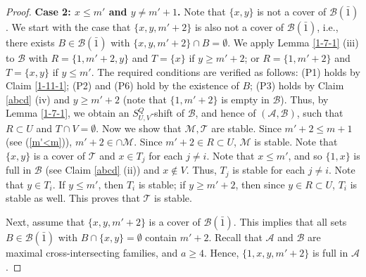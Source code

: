 \documentclass[11pt]{article}
\newcommand{\m}{\mathcal}
\begin{document}
\begin{proof}
{\bf Case 2: $x\le m'$ and $y\ne m'+1$.}
Note that $\{x,y\}$ is not a cover of $\m B(\bar1)$. 
We start with the case that $\{x,y,m'+2\}$ is also not a cover of $\m B(\bar1)$, i.e., there exists $B\in \m B(\bar{1})$ with $\{x,y,m'+2\}\cap B=\emptyset$. 
We apply Lemma \ref{1-7-1} (iii) to $\m B$ with $R=\{1, m'+2, y\}$ and $T=\{x\}$ if $y\ge m'+2$; or  $R=\{1, m'+2\}$ and $T=\{x,y\}$ if $y\le m'$.
The required conditions are verified as follows:
 (P1) holds by Claim \ref{1-11-1}; 
 (P2) and (P6) hold by the existence of $B$;
 (P3) holds by Claim \ref{abcd} (iv) and $y\ge m'+2$ (note that $\{1,m'+2\}$ is empty in $\m B$).
 Thus, by Lemma \ref{1-7-1}, we obtain an $S_{U,V}^Q$-shift of $\m B$, and hence of $(\m A, \m B)$, such that $R\subset U$ and $T\cap V=\emptyset$. 
Now we show that $\m M, \m T$ are stable. 
Since $m'+2\le m+1$ (see (\ref{m'<m})), $m'+2\in \cap \m M$. 
Since $m'+2\in R\subset U$, $\m M$ is stable.
Note that $\{x,y\}$ is a cover of $\m T$ and $x\in T_j$ for each $j\ne i$. 
Note that $x\le m'$, and so $\{1,x\}$ is full in $\m B$ (see Claim \ref{abcd} (ii)) and $x\not\in V$. Thus, $T_j$ is stable for each $j\ne i$. 
Note that $y\in T_i$. 
If $y\le m'$, then $T_i$ is stable; if $y\ge m'+2$, then since $y\in R \subset U$, $T_i$ is stable as well. This proves that $\m T$ is stable. 

Next, assume that $\{x,y, m'+2\}$ is a cover of $ \mathcal{B}(\bar{1})$. This implies that all sets $B\in \m B(\bar1)$ with $B \cap \{x, y\}=\emptyset$ contain $m'+2$. 
Recall that $\m A$ and $\m B$ are maximal cross-intersecting families, and $a\ge 4$. Hence, $\{1,x,y,m'+2\}$ is full in $\m A$.


\end{proof}
\end{document}
